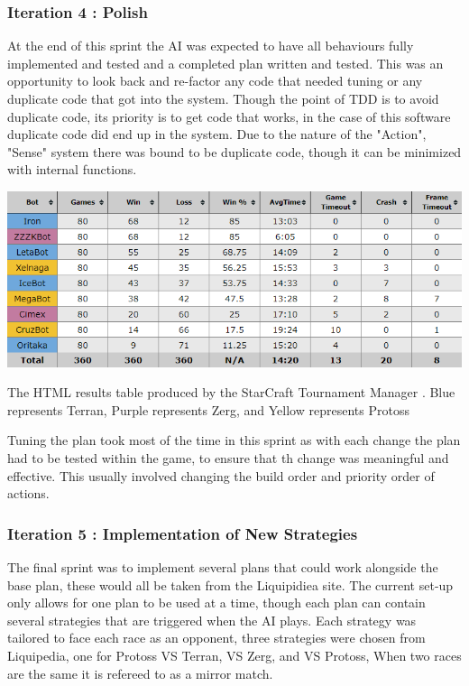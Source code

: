 \documentclass[journal]{IEEEtran}
\begin{document}
\subsubsection{Iteration 4 : Polish}
At the end of this sprint the AI was expected to have all behaviours fully implemented and tested and a completed plan written and tested. This was an opportunity to look back and re-factor any code that needed tuning or any duplicate code that got into the system. Though the point of TDD is to avoid duplicate code, its priority is to get code that works, in the case of this software duplicate code did end up in the system. Due to the nature of the "Action", "Sense" system there was bound to be duplicate code, though it can be minimized with internal functions.
\begin{table}[]
	\centering
	\includegraphics[width=\textwidth]{STMResults}
	\caption{The HTML results table produced by the StarCraft Tournament Manager \cite{Tournament}. Blue represents Terran, Purple represents Zerg, and Yellow represents Protoss}
	\label{Table1}
\end{table}
Tuning the plan took most of the time in this sprint as with each change the plan had to be tested within the game, to ensure that th change was meaningful and effective. This usually involved changing the build order and priority order of actions.
\newline

\subsubsection{Iteration 5 : Implementation of New Strategies}
The final sprint was to implement several plans that could work alongside the base plan, these would all be taken from the Liquipidiea site. The current set-up only allows for one plan to be used at a time, though each plan can contain several strategies that are triggered when the AI plays. Each strategy was tailored to face each race as an opponent, three strategies were chosen from Liquipedia, one for Protoss VS Terran, VS Zerg, and VS Protoss, When two races are the same it is refereed to as a mirror match.
\end{document}
